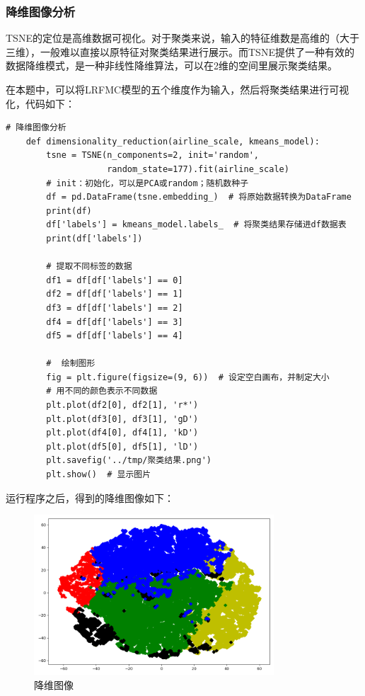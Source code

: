 \documentclass[UTF8,12pt]{article}
\begin{document}
\subsubsection{降维图像分析}
TSNE的定位是高维数据可视化。对于聚类来说，输入的特征维数是高维的（大于三维），一般难以直接以原特征对聚类结果进行展示。而TSNE提供了一种有效的数据降维模式，是一种非线性降维算法，可以在2维的空间里展示聚类结果。

在本题中，可以将LRFMC模型的五个维度作为输入，然后将聚类结果进行可视化，代码如下：

\begin{lstlisting}[title=TSNE可视化,frame=shadowbox]
    # 降维图像分析
    def dimensionality_reduction(airline_scale, kmeans_model):
        tsne = TSNE(n_components=2, init='random',
                    random_state=177).fit(airline_scale)
        # init：初始化，可以是PCA或random；随机数种子
        df = pd.DataFrame(tsne.embedding_)  # 将原始数据转换为DataFrame
        print(df)
        df['labels'] = kmeans_model.labels_  # 将聚类结果存储进df数据表
        print(df['labels'])
    
        # 提取不同标签的数据
        df1 = df[df['labels'] == 0]
        df2 = df[df['labels'] == 1]
        df3 = df[df['labels'] == 2]
        df4 = df[df['labels'] == 3]
        df5 = df[df['labels'] == 4]
    
        #  绘制图形
        fig = plt.figure(figsize=(9, 6))  # 设定空白画布，并制定大小
        # 用不同的颜色表示不同数据
        plt.plot(df2[0], df2[1], 'r*')
        plt.plot(df3[0], df3[1], 'gD')
        plt.plot(df4[0], df4[1], 'kD')
        plt.plot(df5[0], df5[1], 'lD')
        plt.savefig('../tmp/聚类结果.png')
        plt.show()  # 显示图片
\end{lstlisting}

\newpage

运行程序之后，得到的降维图像如下：

\begin{figure}[htbp]
    \centering
    \includegraphics[width=0.8\textwidth]{img/15.png}
    \caption{降维图像}
\end{figure}
\end{document}
